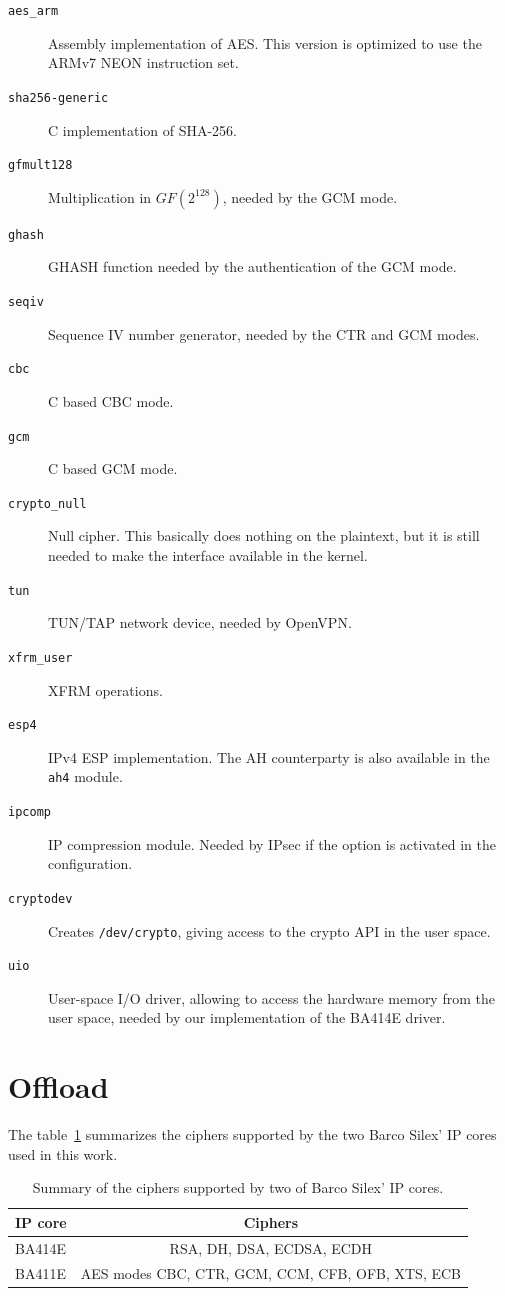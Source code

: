 \begin{description}
	\item[\texttt{aes\_arm}] Assembly implementation of AES. This version is optimized to use the ARMv7 NEON instruction set.
	\item[\texttt{sha256-generic}] C implementation of SHA-256.
	\item[\texttt{gfmult128}] Multiplication in $GF(2^{128})$, needed by the GCM mode.
	\item[\texttt{ghash}] GHASH function needed by the authentication of the GCM mode.
	\item[\texttt{seqiv}] Sequence IV number generator, needed by the CTR and GCM modes.
	\item[\texttt{cbc}] C based CBC mode.
	\item[\texttt{gcm}] C based GCM mode.
	\item[\texttt{crypto\_null}] Null cipher. This basically does nothing on the plaintext, but it is still needed to make the interface available in the kernel.
	\item[\texttt{tun}] TUN/TAP network device, needed by OpenVPN.
	\item[\texttt{xfrm\_user}] XFRM operations.
	\item[\texttt{esp4}] IPv4 ESP implementation. The AH counterparty is also available in the \texttt{ah4} module.
	\item[\texttt{ipcomp}] IP compression module. Needed by IPsec if the option is activated in the configuration.
	\item[\texttt{cryptodev}] Creates \texttt{/dev/crypto}, giving access to the crypto API in the user space.
	\item[\texttt{uio}] User-space I/O driver, allowing to access the hardware memory from the user space, needed by our implementation of the BA414E driver.
\end{description}

\section{Offload}

The table~\ref{tab:ip-ciphers} summarizes the ciphers supported by the two Barco Silex' IP cores used in this work.

\begin{table}[ht]
\center
\begin{tabular}{|l|c|}\hline
IP core & Ciphers \\ \hline
BA414E & RSA, DH, DSA, ECDSA, ECDH \\ 
BA411E & AES modes CBC, CTR, GCM, CCM, CFB, OFB, XTS, ECB \\ \hline
\end{tabular}
\caption{Summary of the ciphers supported by two of Barco Silex' IP cores.}{}
\label{tab:ip-ciphers}
\end{table}

